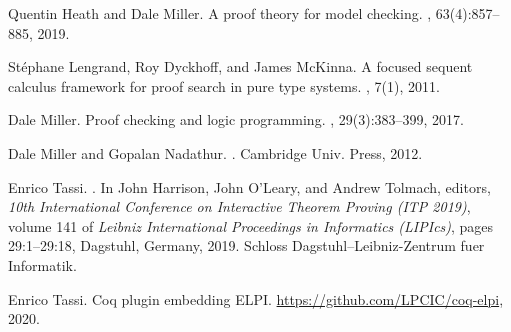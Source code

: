 \documentclass[a4paper]{easychair}
\begin{document}
\begin{thebibliography}{10}
Quentin Heath and Dale Miller.
\newblock A proof theory for model checking.
, 63(4):857--885, 2019.

{St\'ephane} Lengrand, Roy Dyckhoff, and James McKinna.
\newblock A focused sequent calculus framework for proof search in pure type
  systems.
, 7(1), 2011.

Dale Miller.
\newblock Proof checking and logic programming.
, 29(3):383--399, 2017.

Dale Miller and Gopalan Nadathur.
.
\newblock Cambridge Univ. Press, 2012.

Enrico Tassi.
.
\newblock In John Harrison, John O'Leary, and Andrew Tolmach, editors, {\em
  10th International Conference on Interactive Theorem Proving (ITP 2019)},
  volume 141 of {\em Leibniz International Proceedings in Informatics
  (LIPIcs)}, pages 29:1--29:18, Dagstuhl, Germany, 2019. Schloss
  Dagstuhl--Leibniz-Zentrum fuer Informatik.

Enrico Tassi.
\newblock Coq plugin embedding {ELPI}.
\newblock \url{https://github.com/LPCIC/coq-elpi}, 2020.

\end{thebibliography}
\end{document}
